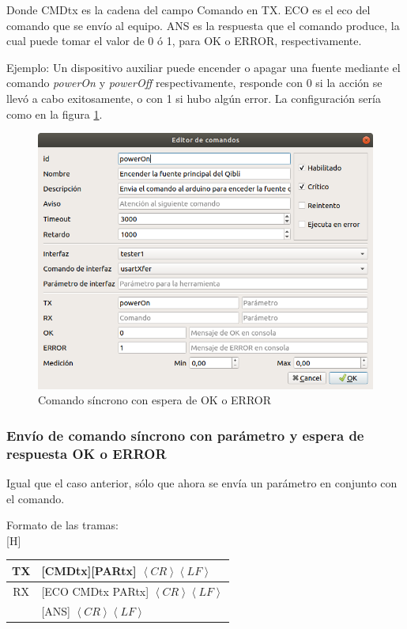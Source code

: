 \documentclass[a4paper,12pt]{refart}
\makeatletter
\renewenvironment{table}%
  {\renewcommand\familydefault\sfdefault
   \@float{table}}
  {\end@float}
\makeatother
\begin{document}
Donde CMDtx es la cadena del campo Comando en TX. ECO es el eco del comando que se envío al equipo. ANS es la respuesta que el comando produce, la cual puede tomar el valor de 0 ó 1, para OK o ERROR, respectivamente.

Ejemplo: Un dispositivo auxiliar puede encender o apagar una fuente mediante el comando \textit{powerOn} y \textit{powerOff} respectivamente, responde con 0 si la acción se llevó a cabo exitosamente, o con 1 si hubo algún error. La configuración sería como en la figura \ref{fig:commands1}.

\begin{figure}[H]\centering
\includegraphics[scale=0.4, frame]{images/commands1} 
\caption{Comando síncrono con espera de OK o ERROR}
\label{fig:commands1}
\end{figure}

\subsubsection{Envío de comando síncrono con parámetro y espera de respuesta OK o ERROR}
Igual que el caso anterior, sólo que ahora se envía un parámetro en conjunto con el comando.

Formato de las tramas:
\\
\begin{table}[H]
\small\centering
\begin{tabular}{|c|l|}
\hline 
TX & [CMDtx][PARtx] $\left\langle CR \right\rangle \left\langle LF \right\rangle$ \\ 
\hline 
RX & [ECO CMDtx PARtx] $\left\langle CR \right\rangle \left\langle LF \right\rangle$ \\
 & [ANS] $\left\langle CR \right\rangle \left\langle LF \right\rangle$ \\ 
\hline
\end{tabular} 
\end{table}
\end{document}

